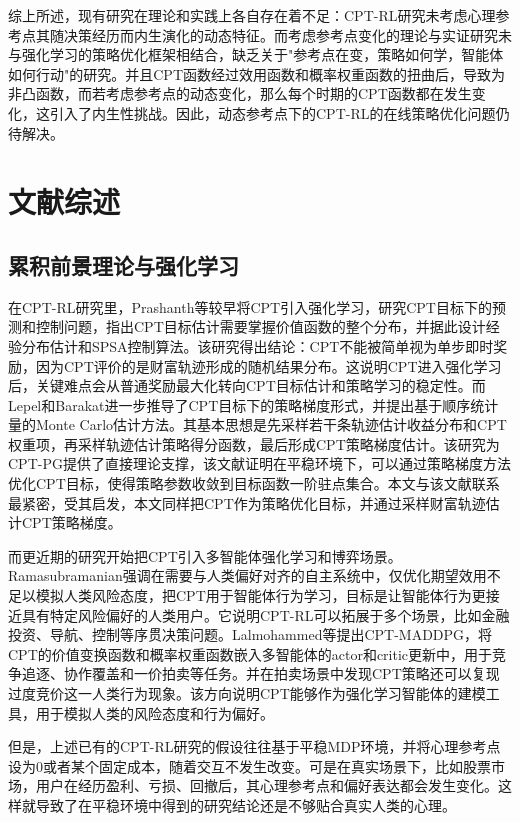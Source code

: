 \documentclass{sufethesismas}
\begin{document}
综上所述，现有研究在理论和实践上各自存在着不足：CPT-RL研究未考虑心理参考点其随决策经历而内生演化的动态特征。而考虑参考点变化的理论与实证研究未与强化学习的策略优化框架相结合，缺乏关于"参考点在变，策略如何学，智能体如何行动"的研究。并且CPT函数经过效用函数和概率权重函数的扭曲后，导致为非凸函数，而若考虑参考点的动态变化，那么每个时期的CPT函数都在发生变化，这引入了内生性挑战。因此，动态参考点下的CPT-RL的在线策略优化问题仍待解决。

\section{文献综述}
\subsection{累积前景理论与强化学习}
在CPT-RL研究里，Prashanth等较早将CPT引入强化学习，研究CPT目标下的预测和控制问题，指出CPT目标估计需要掌握价值函数的整个分布，并据此设计经验分布估计和SPSA控制算法\citep{prashanth2016cumulative}。该研究得出结论：CPT不能被简单视为单步即时奖励，因为CPT评价的是财富轨迹形成的随机结果分布。这说明CPT进入强化学习后，关键难点会从普通奖励最大化转向CPT目标估计和策略学习的稳定性。而Lepel和Barakat进一步推导了CPT目标下的策略梯度形式，并提出基于顺序统计量的Monte Carlo估计方法\citep{lepel2026policygradients}。其基本思想是先采样若干条轨迹估计收益分布和CPT权重项，再采样轨迹估计策略得分函数，最后形成CPT策略梯度估计。该研究为CPT-PG提供了直接理论支撑，该文献证明在平稳环境下，可以通过策略梯度方法优化CPT目标，使得策略参数收敛到目标函数一阶驻点集合。本文与该文献联系最紧密，受其启发，本文同样把CPT作为策略优化目标，并通过采样财富轨迹估计CPT策略梯度。

而更近期的研究开始把CPT引入多智能体强化学习和博弈场景。Ramasubramanian强调在需要与人类偏好对齐的自主系统中，仅优化期望效用不足以模拟人类风险态度，把CPT用于智能体行为学习，目标是让智能体行为更接近具有特定风险偏好的人类用户\citep{ramasubramanian2021reinforcement}。它说明CPT-RL可以拓展于多个场景，比如金融投资、导航、控制等序贯决策问题。Lalmohammed等提出CPT-MADDPG，将CPT的价值变换函数和概率权重函数嵌入多智能体的actor和critic更新中，用于竞争追逐、协作覆盖和一价拍卖等任务。并在拍卖场景中发现CPT策略还可以复现过度竞价这一人类行为现象\citep{lalmohammed2025modeling}。该方向说明CPT能够作为强化学习智能体的建模工具，用于模拟人类的风险态度和行为偏好。

但是，上述已有的CPT-RL研究的假设往往基于平稳MDP环境，并将心理参考点设为0或者某个固定成本，随着交互不发生改变。可是在真实场景下，比如股票市场，用户在经历盈利、亏损、回撤后，其心理参考点和偏好表达都会发生变化。这样就导致了在平稳环境中得到的研究结论还是不够贴合真实人类的心理。
\end{document}
